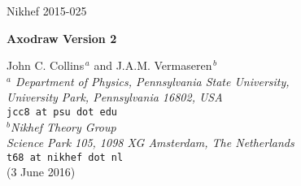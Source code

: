 \documentclass[12pt]{article}
\def\program#1{\texttt{#1}}
\begin{document}



\setcounter{page}{0}
\thispagestyle{empty}
\hfill \begin{minipage}{3.0cm}
Nikhef 2015-025
\end{minipage}
\vspace{20mm}

\begin{center}
{\LARGE\bf\sc Axodraw Version 2}
\end{center}
\vspace{5mm}
\begin{center}
{\large John C. Collins$^{\, a}$ and J.A.M. Vermaseren$^{\, b}$} 
\vspace{1cm}\\
{\it $^a$ Department of Physics, Pennsylvania State University, \\
\vspace{0.1cm}
University Park, Pennsylvania 16802, USA} \\
\texttt{jcc8 at psu dot edu} \\
\vspace{0.5cm}
{\it $^b$Nikhef Theory Group \\
\vspace{0.1cm}
Science Park 105, 1098 XG Amsterdam, The Netherlands} \\
\texttt{t68 at nikhef dot nl} \\
\vspace{1.0cm}
(3 June 2016)
\end{center}
\vspace{5mm}

\begin{abstract}
We present version two of the \LaTeX{} graphical style file Axodraw. 
It has a number of new drawing primitives and many extra options, and 
it can now work with \program{pdflatex} to directly produce
output in PDF file format (but with the aid of an auxiliary program).
\end{abstract}
\end{document}
